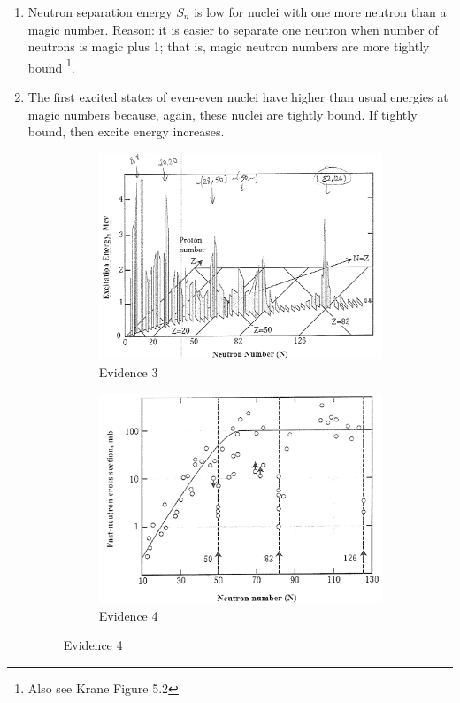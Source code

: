 \documentclass{school-22.101-notes}
\begin{document}
\begin{enumerate}
\begin{enumerate}
\begin{figure}[ht]
\begin{subfigure}[b]{0.45\textwidth}
    \caption{Evidence 2}
    \label{fig:111}
  \end{subfigure}
\end{figure}
\item Neutron separation energy $S_n$ is low for nuclei with one more neutron than a magic number. Reason: it is easier to separate one neutron when number of neutrons is magic plus 1; that is, magic neutron numbers are more tightly bound \footnote{Also see Krane Figure 5.2}. 
\item The first excited states of even-even nuclei have higher than usual energies at magic numbers because, again, these nuclei are tightly bound. If tightly bound, then excite energy increases. 
\begin{figure}[ht]
  \centering
  \begin{subfigure}[b]{0.45\textwidth}
    \centering
    \includegraphics[width=\textwidth]{images/shell/shell-evidence-3.png}
    \caption{Evidence 3}
    \label{fig:111}
  \end{subfigure}
  \begin{subfigure}[b]{0.45\textwidth}
    \centering
    \includegraphics[width=\textwidth]{images/shell/shell-evidence-4.png}
    \caption{Evidence 4}
    \label{fig:111}
  \end{subfigure}
\end{figure}


\end{enumerate}
\end{enumerate}
\end{document}
